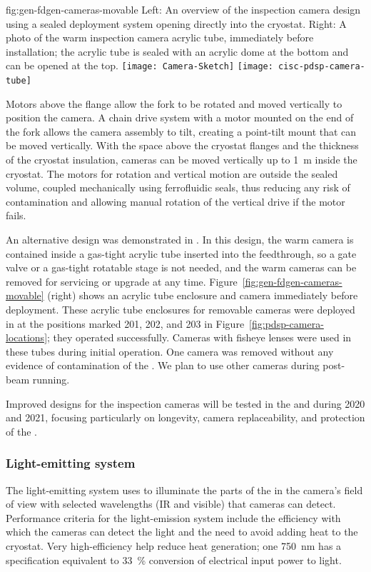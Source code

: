 \begin{dunefigure}{fig:gen-fdgen-cameras-movable}
  {Left: An overview of the inspection camera design using a sealed deployment system opening directly into the cryostat. Right: A photo of the  warm inspection camera acrylic tube, immediately before installation; the acrylic tube is sealed with an acrylic dome at the bottom and can be opened at the top.}
  \texttt{[image: Camera-Sketch]}%
  \texttt{[image: cisc-pdsp-camera-tube]}%
\end{dunefigure}

Motors above the flange allow the fork to be rotated and moved vertically to position the camera. 
 A chain drive system with a motor
mounted on the end of the fork allows the camera assembly to tilt, 
creating a point-tilt mount that can be moved vertically.
With the space above the cryostat flanges and the
thickness of the cryostat insulation, cameras can be moved vertically up to
\SI{1}{m} inside the cryostat.
The motors for rotation and vertical motion are outside the sealed
volume, coupled mechanically using ferrofluidic seals, thus reducing any risk of
contamination and allowing manual rotation of the vertical
drive if the motor fails.  

An alternative design was demonstrated in . In this design, the warm camera is contained inside a gas-tight acrylic tube inserted into the feedthrough, so a gate valve or a gas-tight rotatable stage is not needed, and the warm cameras can be removed for servicing or upgrade at any time. Figure~\ref{fig:gen-fdgen-cameras-movable} (right) shows an acrylic tube enclosure and camera immediately before deployment. 
These acrylic tube enclosures for removable cameras were deployed in  at the positions marked 201, 202, and 203 in Figure~\ref{fig:pdsp-camera-locations}; they operated successfully. Cameras with fisheye lenses were used in these tubes during initial operation.  One camera was removed without any evidence of contamination of the . We plan to use other cameras during post-beam running.

Improved designs for the inspection cameras will be tested in the  and  during 2020 and 2021, focusing particularly on longevity, camera replaceability, and protection of the .


\subsubsection{Light-emitting system}
The light-emitting system uses  to illuminate
the parts of the %
 in the camera's field of view with selected
wavelengths (IR and visible) that cameras can detect.  Performance criteria for the light-emission system include the efficiency with which the cameras can detect the light and the need to avoid
adding heat to the cryostat. Very high-efficiency
help reduce heat generation; one \SI{750}{nm}  \cite{lumileds-DS144-pdf}
has a specification equivalent to
\SI{33}{\%} conversion of electrical input power to light.

